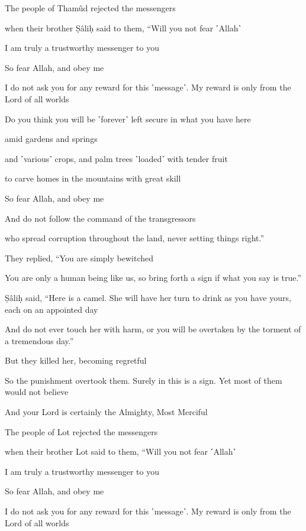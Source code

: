 The people of Thamûd rejected the messengers

when their brother Ṣâliḥ said to them, “Will you not fear ˹Allah˺

I am truly a trustworthy messenger to you

So fear Allah, and obey me

I do not ask you for any reward for this ˹message˺. My reward is only from the Lord of all worlds

Do you think you will be ˹forever˺ left secure in what you have here

amid gardens and springs

and ˹various˺ crops, and palm trees ˹loaded˺ with tender fruit

to carve homes in the mountains with great skill

So fear Allah, and obey me

And do not follow the command of the transgressors

who spread corruption throughout the land, never setting things right.”

They replied, “You are simply bewitched

You are only a human being like us, so bring forth a sign if what you say is true.”

Ṣâliḥ said, “Here is a camel. She will have her turn to drink as you have yours, each on an appointed day

And do not ever touch her with harm, or you will be overtaken by the torment of a tremendous day.”

But they killed her, becoming regretful

So the punishment overtook them. Surely in this is a sign. Yet most of them would not believe

And your Lord is certainly the Almighty, Most Merciful

The people of Lot rejected the messengers

when their brother Lot said to them, “Will you not fear ˹Allah˺

I am truly a trustworthy messenger to you

So fear Allah, and obey me

I do not ask you for any reward for this ˹message˺. My reward is only from the Lord of all worlds


